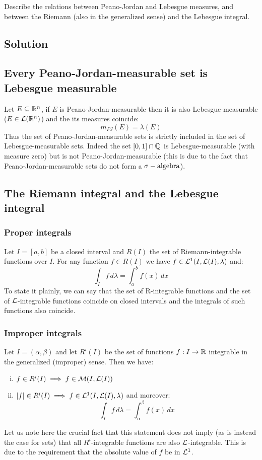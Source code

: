 
\question
Describe the relations between Peano-Jordan and Lebesgue measures, and between the Riemann (also in the generalized sense) and the Lebesgue integral.

\subsection*{Solution}

\subsection{Every Peano-Jordan-measurable set is Lebesgue measurable}
Let $E\subseteq\mathbb{R}^n$, if $E$ is Peano-Jordan-measurable then it is also Lebesgue-measurable ($E\in\mathcal{L}(\mathbb{R}^n)$) and the its measures coincide:
\[
    m_{PJ} (E) = \lambda(E)    
\]
Thus the set of Peano-Jordan-measurable sets is strictly included in the set of Lebesgue-measurable sets. Indeed the set $[0,1]\cap\mathbb{Q}$ is Lebesgue-measurable (with measure zero) but is not Peano-Jordan-measurable (this is due to the fact that Peano-Jordan-measurable sets do not form a $\sigma-\text{algebra}$).

\subsection{The Riemann integral and the Lebesgue integral}

\subsubsection*{Proper integrals}
Let $I=[a,b]$ be a closed interval and $R(I)$ the set of Riemann-integrable functions over $I$. For any function $f\in R(I)$ we have $f\in\mathcal{L}^1(I,\mathcal{L}(I),\lambda)$ and:
\[
    \int_I f \, d\lambda = \int_a^b f(x) \, dx    
\]
To state it plainly, we can say that the set of R-integrable functions and the set of $\mathcal{L}$-integrable functions coincide on closed intervals and the integrals of such functions also coincide.

\subsubsection*{Improper integrals}
Let $I=(\alpha,\beta)$ and let $R^i(I)$ be the set of functions $f:I\to\mathbb{R}$ integrable in the generalized (improper) sense. Then we have:
\begin{enumerate}[i)]
    \item $f\in R^i(I) \implies f\in\mathcal{M}(I,\mathcal{L}(I))$
    \item $|f|\in R^i(I) \implies f\in \mathcal{L}^1(I,\mathcal{L}(I),\lambda)$ and moreover:
        \[
            \int_I f \, d\lambda = \int_\alpha^\beta f(x) \, dx    
        \]
\end{enumerate}
Let us note here the crucial fact that this statement does not imply (as is instead the case for sets) that all $R^i$-integrable functions are also $\mathcal{L}$-integrable. This is due to the requirement that the absolute value of $f$ be in $\mathcal{L}^1$.
